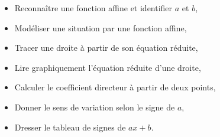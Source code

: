 \documentclass[12pt]{article}
\theoremstyle{break}
\theoremstyle{inline}
\begin{document}
\vfill

\begin{savoir}{}{}
\begin{itemize}[label=--]
  \item Reconnaître une fonction affine et identifier $a$ et $b$,
  \item Modéliser une situation par une fonction affine,
  \item Tracer une droite à partir de son équation réduite,
  \item Lire graphiquement l'équation réduite d'une droite,
  \item Calculer le coefficient directeur à partir de deux points,
  \item Donner le sens de variation selon le signe de $a$,
  \item Dresser le tableau de signes de $ax + b$.
\end{itemize}
\end{savoir}
\end{document}
